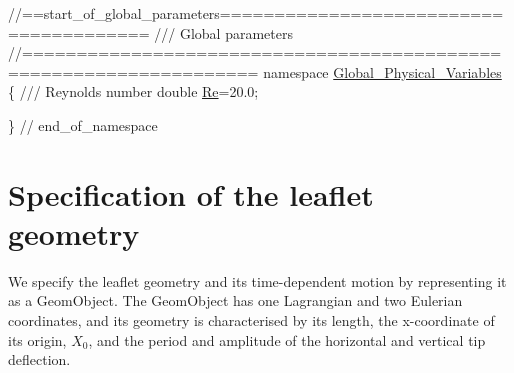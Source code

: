  
\begin{DoxyCodeInclude}
\textcolor{comment}{//==start\_of\_global\_parameters=======================================}
\textcolor{comment}{/// Global parameters}
\textcolor{comment}{}\textcolor{comment}{//===================================================================}
\textcolor{keyword}{namespace }\hyperlink{namespaceGlobal__Physical__Variables}{Global\_Physical\_Variables}
\{
\textcolor{comment}{}
\textcolor{comment}{ /// Reynolds number}
\textcolor{comment}{} \textcolor{keywordtype}{double} \hyperlink{namespaceGlobal__Physical__Variables_ab814e627d2eb5bc50318879d19ab16b9}{Re}=20.0;

\} \textcolor{comment}{// end\_of\_namespace}

\end{DoxyCodeInclude}




 

\hypertarget{index_leaflet}{}\section{Specification of the leaflet geometry}\label{index_leaflet}
We specify the leaflet geometry and its time-\/dependent motion by representing it as a {\ttfamily Geom\+Object}. The {\ttfamily Geom\+Object} has one Lagrangian and two Eulerian coordinates, and its geometry is characterised by its length, the x-\/coordinate of its origin, $ X_0 $, and the period and amplitude of the horizontal and vertical tip deflection.


